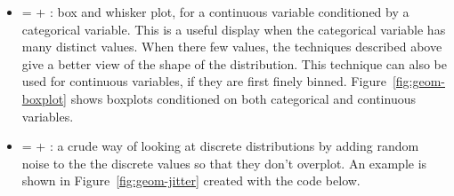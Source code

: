 \begin{itemize}
  \item {} =  + : box and whisker plot, for a continuous variable conditioned by a categorical variable.  This is a useful display when the categorical variable has many distinct values.  When there few values, the techniques described above give a better view of the shape of the distribution.  This technique can also be used for continuous variables, if they are first finely binned.   Figure~\ref{fig:geom-boxplot} shows boxplots conditioned on both categorical and continuous variables.
  
    
  
  \item {} =  + : a crude way of looking at discrete distributions by adding random noise to the the discrete values so that they don't overplot.  An example is shown in Figure~\ref{fig:geom-jitter} created with the code below.
  
    
  


\end{itemize}
